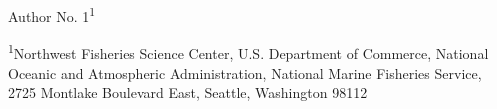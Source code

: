 
\begin{center}
\thispagestyle{empty}


\vspace{.5cm}




Author No. 1\textsuperscript{1}\\

\vspace{.5cm}
% 

\vspace{.3cm}

\textsuperscript{1}Northwest Fisheries Science Center, U.S. Department of Commerce, National Oceanic and Atmospheric Administration, National Marine Fisheries Service, 2725 Montlake Boulevard East, Seattle, Washington 98112\\

\vspace{.3cm}



\vspace{.5cm}


\end{center}
